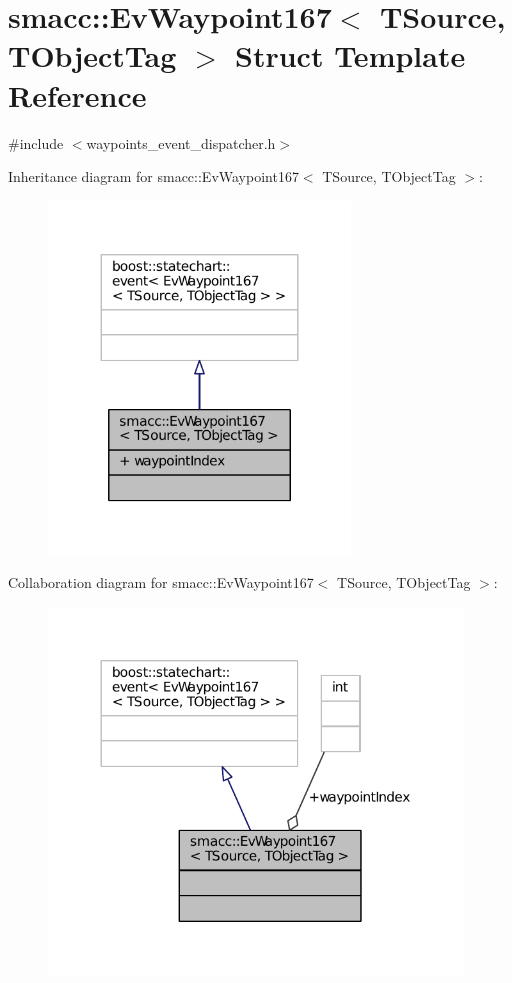 \hypertarget{structsmacc_1_1EvWaypoint167}{}\section{smacc\+:\+:Ev\+Waypoint167$<$ T\+Source, T\+Object\+Tag $>$ Struct Template Reference}
\label{structsmacc_1_1EvWaypoint167}


{\ttfamily \#include $<$waypoints\+\_\+event\+\_\+dispatcher.\+h$>$}



Inheritance diagram for smacc\+:\+:Ev\+Waypoint167$<$ T\+Source, T\+Object\+Tag $>$\+:
\nopagebreak
\begin{figure}[H]
\begin{center}
\leavevmode
\includegraphics[width=227pt]{structsmacc_1_1EvWaypoint167__inherit__graph}
\end{center}
\end{figure}


Collaboration diagram for smacc\+:\+:Ev\+Waypoint167$<$ T\+Source, T\+Object\+Tag $>$\+:
\nopagebreak
\begin{figure}[H]
\begin{center}
\leavevmode
\includegraphics[width=312pt]{structsmacc_1_1EvWaypoint167__coll__graph}
\end{center}
\end{figure}
